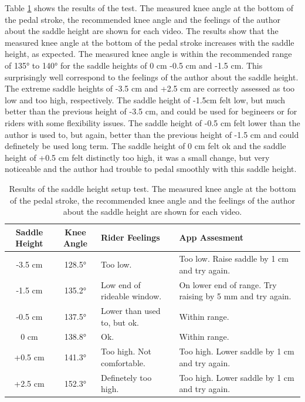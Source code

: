 Table \ref{tab:saddle_height_setup} shows the results of the test. The measured knee angle at the bottom of the pedal stroke, the recommended knee angle and the feelings of the author about the saddle height are shown for each video. The results show that the measured knee angle at the bottom of the pedal stroke increases with the saddle height, as expected. The measured knee angle is within the recommended range of 135° to 140° for the saddle heights of 0 cm -0.5 cm and -1.5 cm. This surprisingly well correspond to the feelings of the author about the saddle height. The extreme saddle heights of -3.5 cm and +2.5 cm are correctly assessed as too low and too high, respectively. The saddle height of -1.5cm felt low, but much better than the previous height of -3.5 cm, and could be used for begineers or for riders with some flexibility issues. The saddle height of -0.5 cm felt lower than the author is used to, but again, better than the previous height of -1.5 cm and could definetely be used long term. The saddle height of 0 cm felt ok and the saddle height of +0.5 cm felt distinctly too high, it was a small change, but very noticeable and the author had trouble to pedal smoothly with this saddle height.

\begin{table}[htbp]

    \centering
    \begin{tabular}{c c p{} p{}}
        \toprule
        Saddle Height & Knee Angle & Rider Feelings              & App Assesment                                             \\
        \midrule
        -3.5 cm       & 128.5°     & Too low.                    & Too low. Raise saddle by 1 cm and try again.              \\
        \midrule
        -1.5 cm       & 135.2°     & Low end of rideable window. & On lower end of range. Try raising by 5 mm and try again. \\
        \midrule
        -0.5 cm       & 137.5°     & Lower than used to, but ok. & Within range.                                             \\
        \midrule
        0 cm          & 138.8°     & Ok.                         & Within range.                                             \\
        \midrule
        +0.5 cm       & 141.3°     & Too high. Not comfortable.  & Too high. Lower saddle by 1 cm and try again.             \\
        \midrule
        +2.5 cm       & 152.3°     & Definetely too high.        & Too high. Lower saddle by 1 cm and try again.             \\
        \bottomrule
    \end{tabular}
    \caption{Results of the saddle height setup test. The measured knee angle at the bottom of the pedal stroke, the recommended knee angle and the feelings of the author about the saddle height are shown for each video.}
    \label{tab:saddle_height_setup}
\end{table}

